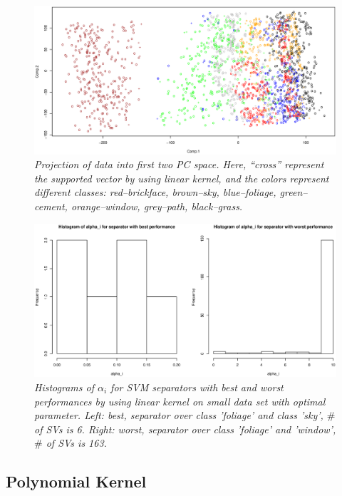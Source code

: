 \documentclass{article}
\begin{document}
\begin{figure}[htp]
\centering
\includegraphics[width=12.1cm]{small_svm_linear.eps}
\caption{\textit{Projection of data into first two PC space. Here, ``cross'' represent the supported vector by using linear kernel, and the colors represent different classes: red--brickface, brown--sky, blue--foliage, green--cement, orange--window, grey--path, black--grass.}}
\end{figure}

\begin{figure}[htp]
\centering
\includegraphics[width=12.1cm]{small_hist_linear.eps}
\caption{\textit{Histograms of $\alpha_{i}$ for SVM separators with best and worst performances by using linear kernel on small data set with optimal parameter. Left: best, separator over class 'foliage' and class 'sky', $\#$ of SVs is 6. Right: worst, separator over class 'foliage' and 'window', $\#$ of SVs is 163.}}
\end{figure}

\goodbreak

\newpage

\subsection{Polynomial Kernel}
\end{document}
